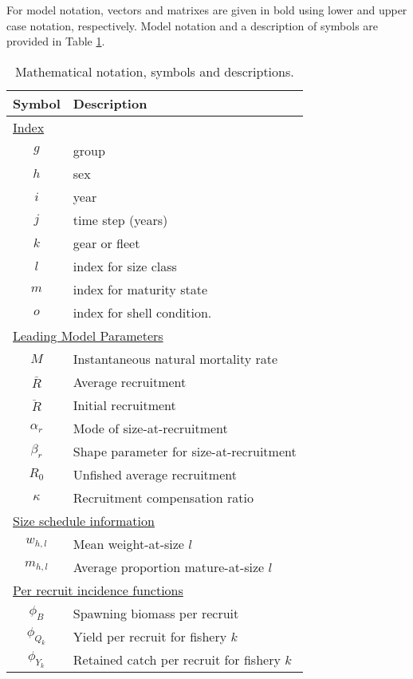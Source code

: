 \documentclass[12pt,letterpaper]{article}
\begin{document}
  For model notation, vectors and matrixes are given in bold using lower and upper case notation, respectively.  Model notation and a description of symbols are provided in Table \ref{tab:notation}.


\begin{table}
  \centering
  \caption{Mathematical notation, symbols and descriptions.}
  \label{tab:notation}
  \begin{tabular}{cl}
  \hline
  Symbol  & Description \\
  \hline
  \multicolumn{2}{l}{\underline{Index}}\\
      $g$ & group \\
      $h$ & sex \\
      $i$ & year \\
      $j$ & time step (years) \\
      $k$ & gear or fleet \\
      $l$ & index for size class \\
      $m$ & index for maturity state \\
      $o$ & index for shell condition. \\
  \multicolumn{2}{l}{\underline{Leading Model Parameters}}\\
      $M$         & Instantaneous natural mortality rate\\
      $\bar{R}$   & Average recruitment\\
      $\ddot{R}$  & Initial recruitment\\
      $\alpha_r$  & Mode of size-at-recruitment\\
      $\beta_r $  & Shape parameter for size-at-recruitment\\
      $R_0$       & Unfished average recruitment\\
      $\kappa$    & Recruitment compensation ratio\\
  \multicolumn{2}{l}{\underline{Size schedule information}}\\
      $w_{h,l}$   & Mean weight-at-size $l$ \\
      $m_{h,l}$   & Average proportion mature-at-size $l$ \\
  \multicolumn{2}{l}{\underline{Per recruit incidence functions}} \\
      $\phi_B$    & Spawning biomass per recruit \\
      $\phi_{Q_k}$& Yield per recruit for fishery $k$\\
      $\phi_{Y_k}$& Retained catch per recruit for fishery $k$ \\

\end{tabular}
\end{table}
\end{document}
